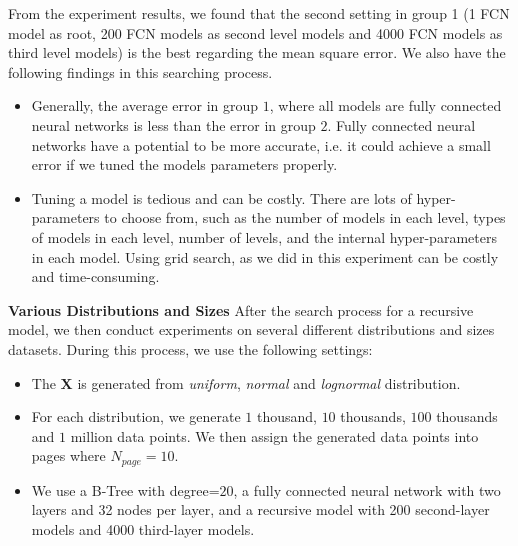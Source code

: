 
From the experiment results, we found that the second setting in group 1 (1 FCN model as root, 200 FCN models as second level models and 4000 FCN models as third level models) is the best regarding the mean square error. We also have the following findings in this searching process.

\begin{itemize}
	\item Generally, the average error in group $1$, where all models are fully connected neural networks is less than the error in group $2$. Fully connected neural networks have a potential to be more accurate, i.e. it could achieve a small error if we tuned the models parameters properly.
	\item Tuning a model is tedious and can be costly. There are lots of hyper-parameters to choose from, such as the number of models in each level, types of models in each level, number of levels, and the internal hyper-parameters in each model. Using grid search, as we did in this experiment can be costly and time-consuming.
\end{itemize}

\textbf{Various Distributions and Sizes} After the search process for a recursive model, we then conduct experiments on several different distributions and sizes datasets. During this process, we use the following settings:

\begin{itemize}
	\item The $\boldsymbol{X}$ is generated from \textit{uniform}, \textit{normal} and \textit{lognormal} distribution.
	\item For each distribution, we generate $1$ thousand, $10$ thousands, $100$ thousands and $1$ million data points. We then assign the generated data points into pages where $N_{page}=10$.
	\item We use a B-Tree with degree=$20$, a fully connected neural network with two layers and 32 nodes per layer, and a recursive model with 200 second-layer models and 4000 third-layer models.
\end{itemize}

